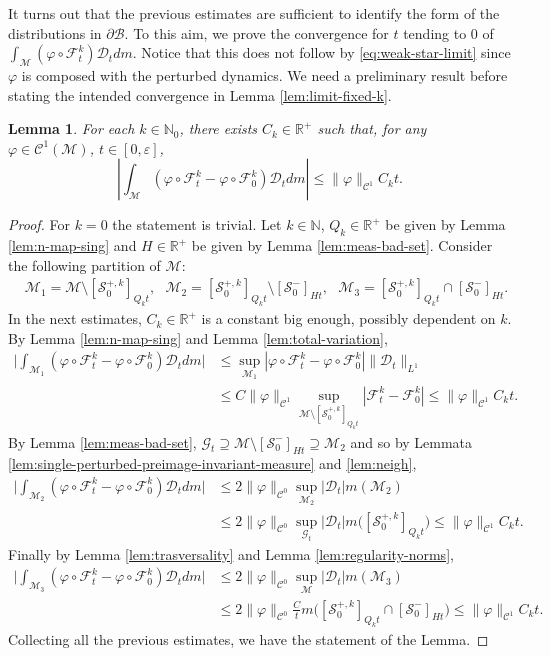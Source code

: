 \documentclass{amsart}
\numberwithin{equation}{section}
\newtheorem{lemma}[theorem]{Lemma}
\newcommand\ve{\varepsilon}
\newcommand\vf{\varphi}
\renewcommand{\le}{\leqslant}
\newcommand\cC{{\mathcal C}}
\newcommand\cF{{\mathcal F}}
\newcommand\cG{{\mathcal G}}
\newcommand\cM{{\mathcal M}}
\newcommand\cS{{\mathcal S}}
\newcommand\bN{{\mathbb N}}
\newcommand\bR{{\mathbb R}}
\newcommand{\Deriv}{\mathcal D}
\begin{document}
It turns out that the previous estimates are sufficient to identify the form of the distributions in \(\partial \mathscr B\). To this aim, we prove the convergence for \(t\) tending to \(0\) of \(\int_{\cM} (\vf \circ \cF_{t}^k) \Deriv_{t} dm\). Notice that this does not follow by \eqref{eq:weak-star-limit} since \(\vf\) is composed with the perturbed dynamics. We need a preliminary result before stating the intended convergence in Lemma \ref{lem:limit-fixed-k}.


\begin{lemma}
  \label{lem:deriv-k}
 For each \(k \in \bN_0\), there exists \(C_k\in \bR^+\) such that, for any \(\vf \in \cC^1(\cM)\), \(t \in [0, \ve]\),
\[
  \left|\int_{\cM} \left(\vf \circ \cF_{t}^k - \vf \circ \cF_0^k\right) \Deriv_{t} dm \right| \le \|\vf\|_{\cC^1} C_k t.
\] 
\end{lemma}
\begin{proof}
 For \(k = 0\) the statement is trivial. Let \(k \in \bN\), \(Q_k \in \bR^+\) be given by Lemma \ref{lem:n-map-sing} and \(H \in \bR^+\) be given by Lemma \ref{lem:meas-bad-set}. Consider the following partition of \(\cM\):
  \[
    \begin{split}
      &\cM_1 = \cM \setminus  [\cS_0^{+,k} ]_{Q_k t}, \text{ }\cM_2 = [\cS_0^{+,k}]_{Q_k t}  \setminus [\cS_0^-]_{H t}, \text{ }\cM_3 =  [\cS_0^{+,k}]_{Q_k t} \cap [\cS_0^-]_{H t} .
    \end{split}
  \]
In the next estimates, \(C_k \in \bR^+\) is a constant big enough, possibly dependent on \(k\). By Lemma \ref{lem:n-map-sing} and Lemma \ref{lem:total-variation}, 
\[
  \begin{split}
   \biggl|\int_{\cM_1} \left(\vf \circ \cF_t^k - \vf \circ \cF_0^k\right)\Deriv_t dm\biggr|&\le \sup_{\cM_1}\left|\vf \circ \cF_t^k - \vf\circ \cF_0^k \right| \|\Deriv_t\|_{L^1}\\
   & \le C \|\vf\|_{\cC^1} \sup_{\cM \setminus  [\cS_0^{+,k}]_{Q_k t} }\left|\cF_t^k - \cF_0^k\right|  \le \|\vf\|_{\cC^1}C_k t.
  \end{split} 
\]
By Lemma \ref{lem:meas-bad-set}, \(\cG_t \supseteq \cM \setminus [\cS_0^-]_{H t} \supseteq \cM_{2}\) and so by Lemmata \ref{lem:single-perturbed-preimage-invariant-measure} and \ref{lem:neigh},
\[
     \begin{split}
      \biggl|\int_{\cM_2}  \left(\vf \circ \cF_t^k - \vf \circ \cF_0^k\right)\Deriv_t dm\biggr| &\le 2\|\vf\|_{\cC^0}\sup_{ \cM_2}\left|\Deriv_t\right| m \left(\cM_2 \right) \\
&\le 2\|\vf\|_{\cC^0} \sup_{\cG_t}\left|\Deriv_t\right| m \bigl([\cS_0^{+,k}]_{Q_k t}\bigr) \le \|\vf\|_{\cC^1}C_k t.
     \end{split}
\]
Finally by Lemma \ref{lem:trasversality} and Lemma \ref{lem:regularity-norms}, 
\[
  \begin{split}
    \biggl|\int_{\cM_3} \left(\vf \circ \cF_t^k - \vf \circ \cF_0^k\right)\Deriv_t dm\biggr| &\le 2\|\vf\|_{\cC^0} \sup_{\cM}|\Deriv_t|m(\cM_3) \\
&\le  2\|\vf\|_{\cC^0} \frac{C}{t} m \bigl( [\cS_0^{+,k}]_{Q_k t} \cap [\cS_0^-]_{H t}\bigr) \le \|\vf\|_{\cC^1}C_k t. 
  \end{split}
\]
Collecting all the previous estimates, we have the statement of the Lemma.
\end{proof}
\end{document}
